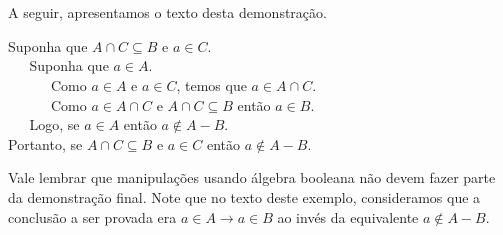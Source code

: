 \begin{Example}
A seguir, apresentamos o texto desta demonstração.
\begin{flushleft}
Suponha que $A\cap C\subseteq B$ e $a \in C$.\\
\verb|   |Suponha que $a\in A$.\\
\verb|      |Como $a\in A$ e $a\in C$, temos que $a\in A \cap C$.\\
\verb|      |Como $a\in A\cap C$ e $A\cap C\subseteq B$ então $a\in B$.\\
\verb|   |Logo, se $a \in A$ então $a\not\in A - B$.\\
Portanto, se $A\cap C\subseteq B$ e $a \in C$ então $a\not\in A - B$.
\end{flushleft}
Vale lembrar que manipulações usando álgebra booleana não devem fazer
parte da demonstração final. Note que no texto deste exemplo,
consideramos que a conclusão a ser provada era $a\in A \to a \in B$ ao
invés da equivalente $a\not\in A - B$.
\end{Example}
